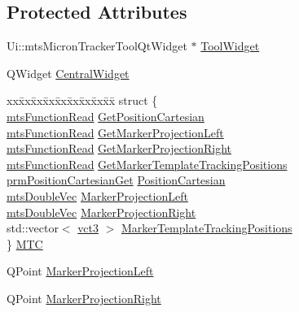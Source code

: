 \subsection*{Protected Attributes}
\begin{DoxyCompactItemize}
\item 
Ui\-::mts\-Micron\-Tracker\-Tool\-Qt\-Widget $\ast$ \hyperlink{classmts_micron_tracker_tool_qt_component_a78d45496b35b856b483e6600599dc4a4}{Tool\-Widget}
\item 
Q\-Widget \hyperlink{classmts_micron_tracker_tool_qt_component_a3337bf48f13cbad9c9101c9aff7a651f}{Central\-Widget}
\item 
\begin{tabbing}
xx\=xx\=xx\=xx\=xx\=xx\=xx\=xx\=xx\=\kill
struct \{\\
\>\hyperlink{classmts_function_read}{mtsFunctionRead} \hyperlink{classmts_micron_tracker_tool_qt_component_accf890d374d0341c43fa64d5f87d170e}{GetPositionCartesian}\\
\>\hyperlink{classmts_function_read}{mtsFunctionRead} \hyperlink{classmts_micron_tracker_tool_qt_component_a2abf35a246c2f4d85351f8d7a08b3e23}{GetMarkerProjectionLeft}\\
\>\hyperlink{classmts_function_read}{mtsFunctionRead} \hyperlink{classmts_micron_tracker_tool_qt_component_aba2e8b10296d4678cfc7000c0e3e0c51}{GetMarkerProjectionRight}\\
\>\hyperlink{classmts_function_read}{mtsFunctionRead} \hyperlink{classmts_micron_tracker_tool_qt_component_a50e15e14b556c72dea6ce2fed154757c}{GetMarkerTemplateTrackingPositions}\\
\>\hyperlink{classprm_position_cartesian_get}{prmPositionCartesianGet} \hyperlink{classmts_micron_tracker_tool_qt_component_a9ce46838a73866850a7a06a339b4d121}{PositionCartesian}\\
\>\hyperlink{mts_vector_8h_af69167a5dc2ad33eb93965b9387d8403}{mtsDoubleVec} \hyperlink{classmts_micron_tracker_tool_qt_component_a1c3d33fbe36a6456bc41353957493b37}{MarkerProjectionLeft}\\
\>\hyperlink{mts_vector_8h_af69167a5dc2ad33eb93965b9387d8403}{mtsDoubleVec} \hyperlink{classmts_micron_tracker_tool_qt_component_ab0ed4ae030ebd937c8719cc8e4457289}{MarkerProjectionRight}\\
\>std::vector$<$ \hyperlink{vct_fixed_size_vector_types_8h_a3af82acdbf4eeb73c551909240b106ea}{vct3} $>$ \hyperlink{classmts_micron_tracker_tool_qt_component_a279cda1e8aff6c12de27f2bbe39bc1d9}{MarkerTemplateTrackingPositions}\\
\} \hyperlink{classmts_micron_tracker_tool_qt_component_a8386ee26f85095141f5ad40fda1e6f50}{MTC}\\

\end{tabbing}\item 
Q\-Point \hyperlink{classmts_micron_tracker_tool_qt_component_a767c7737649f8612dc6df81df6453bd8}{Marker\-Projection\-Left}
\item 
Q\-Point \hyperlink{classmts_micron_tracker_tool_qt_component_a64ed0572f729b8a0505f4b28d7cf20fe}{Marker\-Projection\-Right}
\end{DoxyCompactItemize}
